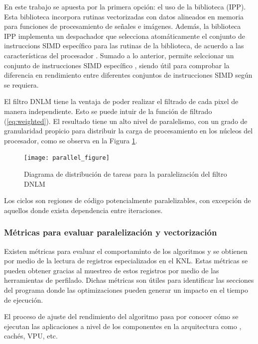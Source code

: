 En este trabajo se apuesta por la primera opción: el uso de la biblioteca  (IPP). Esta biblioteca incorpora rutinas vectorizadas con datos alineados en memoria para funciones de procesamiento de se\~nales e imágenes. Además, la biblioteca IPP implementa un despachador que selecciona atomáticamente el conjunto de instruccions SIMD específico para las rutinas de la biblioteca, de acuerdo a las características del procesador \cite{IntelCorporation2017}.  Sumado a lo anterior, permite selccionar un conjunto de instrucciones SIMD específico \cite{IntelCorporation2017}, siendo útil para comprobar la diferencia en rendimiento entre diferentes conjuntos de instrucciones SIMD según se requiera.

El filtro DNLM tiene la ventaja de poder realizar el filtrado de cada pixel de manera independiente. Esto se puede intuir de la función de filtrado (\ref{eq:weighted}). El resultado tiene un alto nivel de paralelismo, con un grado de granularidad propicio para distribuir la carga de procesamiento en los núcleos del procesador, como se observa en la Figura \ref{fig:parallel_figure}. 



\begin{figure}[H]
   \centering
   \caption[Diagrama de distribución de tareas paralelas]{Diagrama de distribución de tareas para la paralelización del filtro DNLM}
   \texttt{[image: parallel\_figure]}
   \label{fig:parallel_figure}
 \end{figure}
 
 
 Los ciclos son regiones de código potencialmente paralelizables, con excepción de aquellos donde exista dependencia entre iteraciones. 
 
\subsubsection{Métricas para evaluar paralelización y vectorización}
 
Existen métricas para evaluar el comportaminto de los algoritmos y se obtienen por medio de la lectura de registros especializados en el KNL. Estas métricas se pueden obtener gracias al muestreo de estos registros por medio de las herramientas de perfilado. Dichas métricas son útiles para identificar las secciones del programa donde las optimizaciones pueden generar un impacto en el tiempo de ejecución.

El proceso de ajuste del rendimiento del algoritmo pasa por conocer cómo se ejecutan las aplicaciones a nivel de los componentes en la arquitectura como , cachés, VPU, etc.

